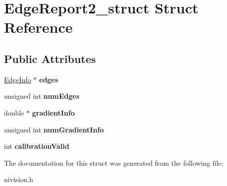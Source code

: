 \hypertarget{structEdgeReport2__struct}{\section{\-Edge\-Report2\-\_\-struct \-Struct \-Reference}
\label{structEdgeReport2__struct}
}
\subsection*{\-Public \-Attributes}
\begin{DoxyCompactItemize}
\item 
\hypertarget{structEdgeReport2__struct_a873de8db58b737707d22c33d0dc0609e}{\hyperlink{structEdgeInfo__struct}{\-Edge\-Info} $\ast$ {\bfseries edges}}\label{structEdgeReport2__struct_a873de8db58b737707d22c33d0dc0609e}

\item 
\hypertarget{structEdgeReport2__struct_a2e8f492c86b417580a4afa0974a94ba6}{unsigned int {\bfseries num\-Edges}}\label{structEdgeReport2__struct_a2e8f492c86b417580a4afa0974a94ba6}

\item 
\hypertarget{structEdgeReport2__struct_a9f1eaa71c1c6670886eca20a8b1d7bbe}{double $\ast$ {\bfseries gradient\-Info}}\label{structEdgeReport2__struct_a9f1eaa71c1c6670886eca20a8b1d7bbe}

\item 
\hypertarget{structEdgeReport2__struct_ae3ce97361b1fae999cf448f646e45dda}{unsigned int {\bfseries num\-Gradient\-Info}}\label{structEdgeReport2__struct_ae3ce97361b1fae999cf448f646e45dda}

\item 
\hypertarget{structEdgeReport2__struct_ab2927da4cee79affd3ff6a10c01d6aed}{int {\bfseries calibration\-Valid}}\label{structEdgeReport2__struct_ab2927da4cee79affd3ff6a10c01d6aed}

\end{DoxyCompactItemize}


\-The documentation for this struct was generated from the following file\-:\begin{DoxyCompactItemize}
\item 
nivision.\-h\end{DoxyCompactItemize}

